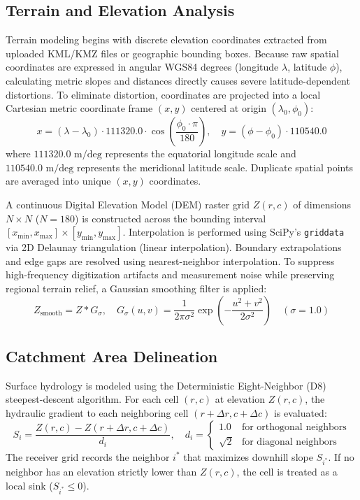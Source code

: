 \documentclass[manuscript,screen,nonacm]{acmart}
\begin{document}
\subsection{Terrain and Elevation Analysis}
Terrain modeling begins with discrete elevation coordinates extracted from uploaded KML/KMZ files or geographic bounding boxes. Because raw spatial coordinates are expressed in angular WGS84 degrees (longitude $\lambda$, latitude $\phi$), calculating metric slopes and distances directly causes severe latitude-dependent distortions. To eliminate distortion, coordinates are projected into a local Cartesian metric coordinate frame $(x, y)$ centered at origin $(\lambda_0, \phi_0)$:
\begin{equation}
x = (\lambda - \lambda_0) \cdot 111320.0 \cdot \cos\left(\frac{\phi_0 \cdot \pi}{180}\right), \quad y = (\phi - \phi_0) \cdot 110540.0
\end{equation}
where $111320.0\text{ m/deg}$ represents the equatorial longitude scale and $110540.0\text{ m/deg}$ represents the meridional latitude scale. Duplicate spatial points are averaged into unique $(x, y)$ coordinates.

A continuous Digital Elevation Model (DEM) raster grid $Z(r, c)$ of dimensions $N \times N$ ($N=180$) is constructed across the bounding interval $[x_{\min}, x_{\max}] \times [y_{\min}, y_{\max}]$. Interpolation is performed using SciPy's \texttt{griddata} via 2D Delaunay triangulation (linear interpolation). Boundary extrapolations and edge gaps are resolved using nearest-neighbor interpolation. To suppress high-frequency digitization artifacts and measurement noise while preserving regional terrain relief, a Gaussian smoothing filter is applied:
\begin{equation}
Z_{\text{smooth}} = Z * G_\sigma, \quad G_\sigma(u, v) = \frac{1}{2\pi\sigma^2} \exp\left(-\frac{u^2 + v^2}{2\sigma^2}\right) \quad (\sigma = 1.0)
\end{equation}

\subsection{Catchment Area Delineation}
Surface hydrology is modeled using the Deterministic Eight-Neighbor (D8) steepest-descent algorithm. For each cell $(r, c)$ at elevation $Z(r, c)$, the hydraulic gradient to each neighboring cell $(r + \Delta r, c + \Delta c)$ is evaluated:
\begin{equation}
S_i = \frac{Z(r, c) - Z(r + \Delta r, c + \Delta c)}{d_i}, \quad d_i = \begin{cases} 1.0 & \text{for orthogonal neighbors} \\ \sqrt{2} & \text{for diagonal neighbors} \end{cases}
\end{equation}
The receiver grid records the neighbor $i^*$ that maximizes downhill slope $S_{i^*}$. If no neighbor has an elevation strictly lower than $Z(r, c)$, the cell is treated as a local sink ($S_{i^*} \le 0$).
\end{document}
